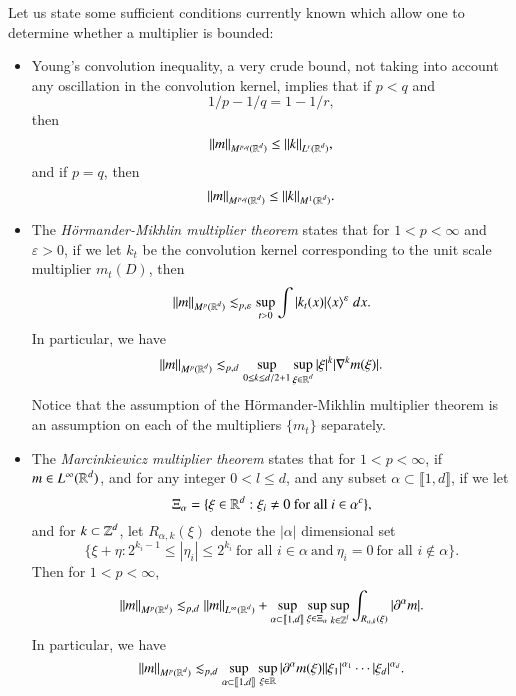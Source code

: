 Let us state some sufficient conditions currently known which allow one to determine whether a multiplier is bounded:
%
\begin{itemize}
    \item Young's convolution inequality, a very crude bound, not taking into account any oscillation in the convolution kernel, implies that if $p < q$ and
    \[ 1/p - 1/q = 1 - 1/r, \]
    then
    \[ \| m \|_{M^{p,q}(\operatorname{\mathbb{R}}^d)} \leq \| k \|_{L^r(\operatorname{\mathbb{R}}^d)}, \]
    and if $p = q$, then
    \[ \| m \|_{M^{p,q}(\operatorname{\mathbb{R}}^d)} \leq \| k \|_{M^1(\operatorname{\mathbb{R}}^d)}. \]
%
% 
%
%
%
%

    \item The \emph{H\"{o}rmander-Mikhlin multiplier theorem} states that for $1 < p < \infty$ and $\varepsilon > 0$, if we let $k_t$ be the convolution kernel corresponding to the unit scale multiplier $m_t(D)$, then
    \[ \| m \|_{M^p(\operatorname{\mathbb{R}}^d)} \lesssim_{p,\varepsilon} \sup_{t > 0} \int |k_t(x)| \langle x \rangle^\varepsilon\; dx. \]
    In particular, we have
    \[ \| m \|_{M^p(\operatorname{\mathbb{R}}^d)} \lesssim_{p,d} \sup_{0 \leq k \leq d/2 + 1} \sup_{\xi \in \operatorname{\mathbb{R}}^d} |\xi|^k |\nabla^k m(\xi)|. \]
    Notice that the assumption of the H\"{o}rmander-Mikhlin multiplier theorem is an assumption on each of the multipliers $\{ m_t \}$ separately.

    \item The \emph{Marcinkiewicz multiplier theorem} states that for $1 < p < \infty$, if $m \in L^\infty(\operatorname{\mathbb{R}}^d)$, and for any integer $0 < l \leq d$, and any subset $\alpha \subset \llbracket 1,d \rrbracket$, if we let
    \[ \Xi_\alpha = \{ \xi \in \operatorname{\mathbb{R}}^d: \xi_i \neq 0\ \text{for all $i \in \alpha^c$} \}, \]
    and for $k \subset \operatorname{\mathbb{Z}}^d$, let $R_{\alpha,k}(\xi)$ denote the $|\alpha|$ dimensional set
    \[ \{ \xi + \eta: 2^{k_i-1} \leq |\eta_i| \leq 2^{k_i}\ \text{for all $i \in \alpha$}\ \text{and}\ \eta_i = 0\ \text{for all $i \not \in \alpha$} \}. \]
    Then for $1 < p < \infty$,
    \[ \| m \|_{M^p(\operatorname{\mathbb{R}}^d)} \lesssim_{p,d} \| m \|_{L^\infty(\operatorname{\mathbb{R}}^d)} + \sup_{\alpha \subset \llbracket 1,d \rrbracket} \sup_{\xi \in \Xi_\alpha} \sup_{k \in \operatorname{\mathbb{Z}}^l} \int_{R_{\alpha,k}(\xi)} |\partial^\alpha m|. \]
    In particular, we have
    \[ \| m \|_{M^p(\operatorname{\mathbb{R}}^d)} \lesssim_{p,d} \sup_{\alpha \subset \llbracket 1,d \rrbracket} \sup_{\xi \in \operatorname{\mathbb{R}}} |\partial^\alpha m(\xi)| |\xi_1|^{\alpha_1} \cdots |\xi_d|^{\alpha_d}. \]
\end{itemize}

